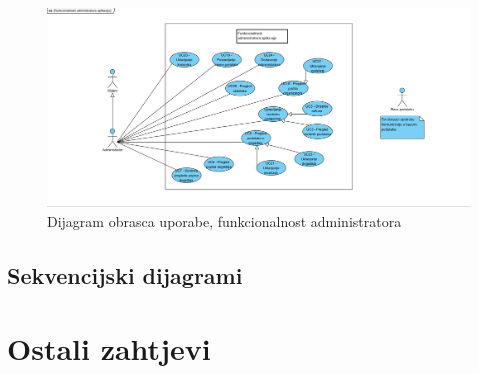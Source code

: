 					\begin{figure}[htbp]
						\centering
						\includegraphics[width=1\textwidth]{dijagrami/obrazac_funkcionalnost_administratora.png}
						\caption{Dijagram obrasca uporabe, funkcionalnost administratora}
					\label{fig:my_image}
					\end{figure}

				\eject
				\pagebreak
			
			\newpage
			\subsection{Sekvencijski dijagrami}
				
				
				\eject
	
		\section{Ostali zahtjevi}
			 
